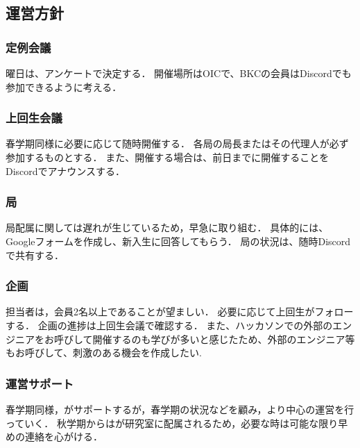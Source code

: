 \subsection*{運営方針}


\subsubsection*{定例会議}
曜日は、アンケートで決定する．
開催場所はOICで、BKCの会員はDiscordでも参加できるように考える．

\subsubsection*{上回生会議}
春学期同様に必要に応じて随時開催する．
各局の局長またはその代理人が必ず参加するものとする．
また、開催する場合は、前日までに開催することをDiscordでアナウンスする．


\subsubsection*{局}
局配属に関しては遅れが生じているため，早急に取り組む．
具体的には、Googleフォームを作成し、新入生に回答してもらう．
局の状況は、随時Discordで共有する．


\subsubsection*{企画}
担当者は，会員2名以上であることが望ましい．
必要に応じて上回生がフォローする．
企画の進捗は上回生会議で確認する．
また、ハッカソンでの外部のエンジニアをお呼びして開催するのも学びが多いと感じたため、外部のエンジニア等もお呼びして、刺激のある機会を作成したい.

\subsubsection*{運営サポート}
春学期同様，\thirdGrade{}がサポートするが，春学期の状況などを顧み，より\secondGrade{}中心の運営を行っていく．
秋学期からは\thirdGrade{}が研究室に配属されるため，必要な時は可能な限り早めの連絡を心がける．